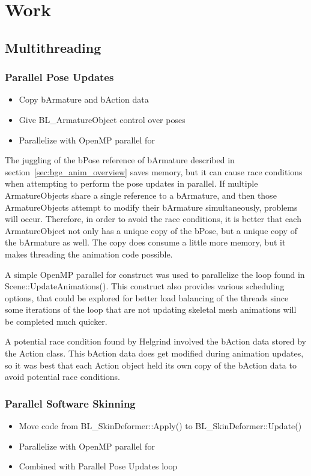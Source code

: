 \section{Work}
\subsection{Multithreading}
\subsubsection{Parallel Pose Updates}
\ifsummaries
\begin{itemize}
 \item Copy bArmature and bAction data
 \item Give BL\_ArmatureObject control over poses
 \item Parallelize with OpenMP parallel for
\end{itemize}
\fi

The juggling of the bPose reference of bArmature described in section~\ref{sec:bge_anim_overview} saves memory, but it can cause race conditions when attempting to perform the pose updates in parallel.
If multiple ArmatureObjects share a single reference to a bArmature, and then those ArmatureObjects attempt to modify their bArmature simultaneously, problems will occur.
Therefore, in order to avoid the race conditions, it is better that each ArmatureObject not only has a unique copy of the bPose, but a unique copy of the bArmature as well.
The copy does consume a little more memory, but it makes threading the animation code possible.

A simple OpenMP parallel for construct was used to parallelize the loop found in Scene::UpdateAnimations().
This construct also provides various scheduling options, that could be explored for better load balancing of the threads since some iterations of the loop that are not updating skeletal mesh animations will be completed much quicker.

A potential race condition found by Helgrind involved the bAction data stored by the Action class.
This bAction data does get modified during animation updates, so it was best that each Action object held its own copy of the bAction data to avoid potential race conditions.



\subsubsection{Parallel Software Skinning}
\ifsummaries
\begin{itemize}
 \item Move code from BL\_SkinDeformer::Apply() to BL\_SkinDeformer::Update()
 \item Parallelize with OpenMP parallel for
 \item Combined with Parallel Pose Updates loop
\end{itemize}
\fi

